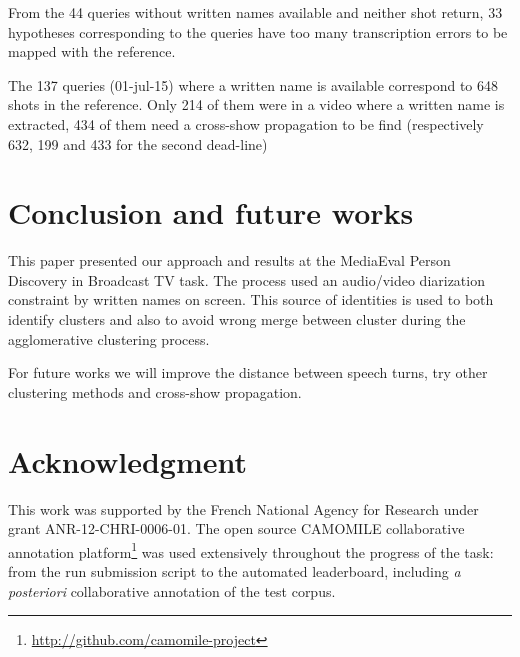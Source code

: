 \documentclass{acm_proc_article-me}
\begin{document}
From the 44 queries without written names available and neither shot return, 33 hypotheses corresponding to the queries have too many transcription errors to be mapped with the reference.

The 137 queries (01-jul-15) where a written name is available correspond to 648 shots in the reference. Only 214 of them were in a video where a written name is extracted, 434 of them need a cross-show propagation to be find (respectively 632, 199 and 433 for the second dead-line)


\section{Conclusion and future works}

This paper presented our approach and results at the MediaEval Person Discovery in Broadcast TV task. The process used an audio/video diarization constraint by written names on screen. 
This source of identities is used to both identify clusters and also to avoid wrong merge between cluster during the agglomerative clustering process.

For future works we will improve the distance between speech turns, try other clustering methods and cross-show propagation. 


\section{Acknowledgment}

This work was supported by the French National Agency for Research under grant ANR-12-CHRI-0006-01.
The open source CAMOMILE collaborative annotation platform\footnote{\url{http://github.com/camomile-project}} was used extensively throughout the progress of the task: from the run submission script to the automated leaderboard, including \emph{a posteriori} collaborative annotation of the test corpus.




\end{document}
